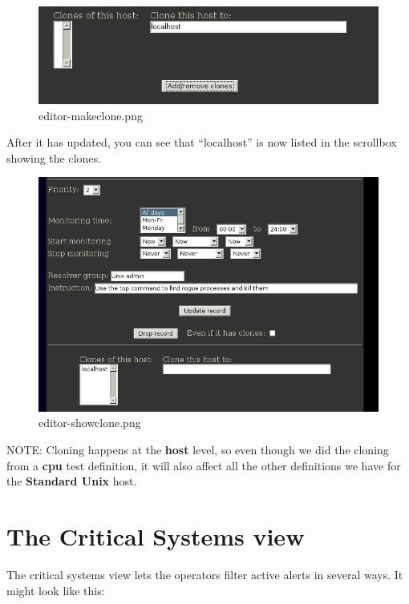 \begin{figure} \centering \caption{editor-makeclone.png}\label{editor-makeclone.png}
\includegraphics[scale=0.5]{./editor-makeclone.png} 
\end{figure}

 After it has updated, you can see that ``localhost'' is now listed in
 the scrollbox showing the clones. 

\begin{figure} \centering \caption{editor-showclone.png}\label{editor-showclone.png}
\includegraphics[scale=0.5]{./editor-showclone.png} 
\end{figure}

 NOTE: Cloning happens at the \textbf{host} level, so even though we
 did the cloning from a \textbf{cpu} test definition, it will also
 affect all the other definitions we have for the \textbf{Standard
 Unix} host.

\section{The Critical Systems view}


 The critical systems view lets the operators filter active alerts in
 several ways. It might look like this: 

